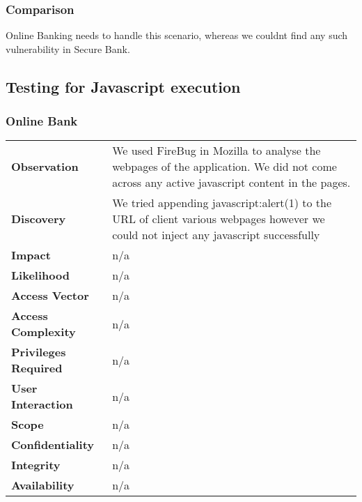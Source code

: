 \subsubsection*{Comparison}
Online Banking needs to handle this scenario, whereas we couldnt find any such vulnerability in Secure Bank.

\subsection{Testing for Javascript execution}
\subsubsection{Online Bank}
\begin{tabular}{l|p{10cm}}
\textbf{Observation} & We used FireBug in Mozilla to analyse the webpages of the application. We did not come across any active javascript content in the pages.  \\
\textbf{Discovery} & We tried appending javascript:alert(1) to the URL of client various webpages however we could not inject any javascript successfully \\
\textbf{Impact} &  n/a\\
\textbf{Likelihood} & n/a \\
\textbf{Access Vector} & n/a \\
\textbf{Access Complexity} & n/a \\
\textbf{Privileges Required} & n/a \\
\textbf{User Interaction} & n/a \\
\textbf{Scope} & n/a \\
\textbf{Confidentiality} & n/a \\
\textbf{Integrity} & n/a \\
\textbf{Availability} & n/a \\
\end{tabular}

